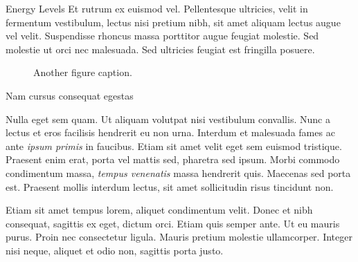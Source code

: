 \documentclass[final]{beamer}
\newlength{\colwidth}
\begin{document}
\begin{frame}[t]
\begin{columns}[t]
\begin{column}{\colwidth}
\begin{block}{Energy Levels}
    Et rutrum ex euismod vel. Pellentesque ultricies, velit in fermentum
    vestibulum, lectus nisi pretium nibh, sit amet aliquam lectus augue vel
    velit. Suspendisse rhoncus massa porttitor augue feugiat molestie. Sed
    molestie ut orci nec malesuada. Sed ultricies feugiat est fringilla
    posuere.

    \begin{figure}
      \centering
      \caption{Another figure caption.}
    \end{figure}

  \end{block}

  \begin{block}{Nam cursus consequat egestas}

    Nulla eget sem quam. Ut aliquam volutpat nisi vestibulum convallis. Nunc a
    lectus et eros facilisis hendrerit eu non urna. Interdum et malesuada fames
    ac ante \textit{ipsum primis} in faucibus. Etiam sit amet velit eget sem
    euismod tristique. Praesent enim erat, porta vel mattis sed, pharetra sed
    ipsum. Morbi commodo condimentum massa, \textit{tempus venenatis} massa
    hendrerit quis. Maecenas sed porta est. Praesent mollis interdum lectus,
    sit amet sollicitudin risus tincidunt non.

    Etiam sit amet tempus lorem, aliquet condimentum velit. Donec et nibh
    consequat, sagittis ex eget, dictum orci. Etiam quis semper ante. Ut eu
    mauris purus. Proin nec consectetur ligula. Mauris pretium molestie
    ullamcorper. Integer nisi neque, aliquet et odio non, sagittis porta justo.


\end{block}
\end{column}
\end{columns}
\end{frame}
\end{document}

